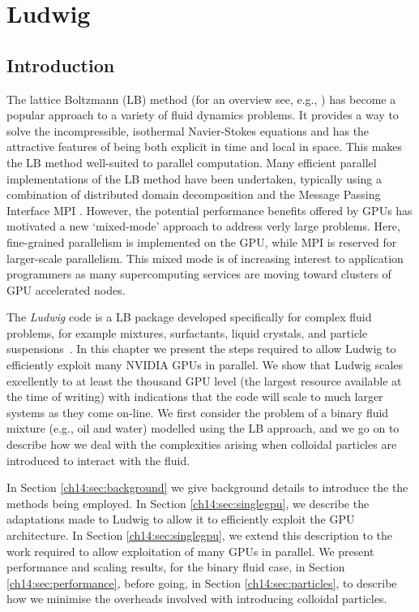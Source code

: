 
\chapter{Ludwig}



\section{Introduction}
The lattice Boltzmann (LB) method (for an overview see, e.g.,
\cite{succi-book}) has become a popular approach to a variety of fluid
dynamics problems.  It provides a way to solve the incompressible,
isothermal Navier-Stokes equations and has the attractive features of
being both explicit in time and local in space. This makes the LB
method well-suited to parallel computation. Many efficient parallel
implementations of the LB method have been undertaken, typically using
a combination of distributed domain decomposition and the Message
Passing Interface MPI \cite{mpi-standard}. However, the potential
performance benefits offered by GPUs has motivated a new `mixed-mode'
approach to address verly large problems. Here, fine-grained
parallelism is implemented on the GPU, while MPI is reserved for
larger-scale parallelism.  This mixed mode is of increasing interest
to application programmers as many supercomputing services are moving
toward clusters of GPU accelerated nodes.

The \textit{Ludwig} code \cite{desplat} is a LB package developed
specifically for complex fluid problems, for example mixtures,
surfactants, liquid crystals, and particle
suspensions~\cite{aidun2010}.  In this chapter we present the steps
required to allow Ludwig to efficiently exploit many NVIDIA GPUs in
parallel.  We show that Ludwig scales excellently to at least the
thousand GPU level (the largest resource available at the time of
writing) with indications that the code will scale to much larger
systems as they come on-line. We first consider the problem of a
binary fluid mixture (e.g., oil and water) modelled using the LB
approach, and we go on to describe how we deal with the complexities
arising when colloidal particles are introduced to interact with the
fluid.

In Section \ref{ch14:sec:background} we give background details to
introduce the the methods being employed. In Section
\ref{ch14:sec:singlegpu}, we describe the adaptations made to Ludwig
to allow it to efficiently exploit the GPU architecture. In Section
\ref{ch14:sec:singlegpu}, we extend this description to the work
required to allow exploitation of many GPUs in parallel. We present
performance and scaling results, for the binary fluid case, in Section
\ref{ch14:sec:performance}, before going, in Section
\ref{ch14:sec:particles}, to describe how we minimise the overheads
involved with introducing colloidal particles.



